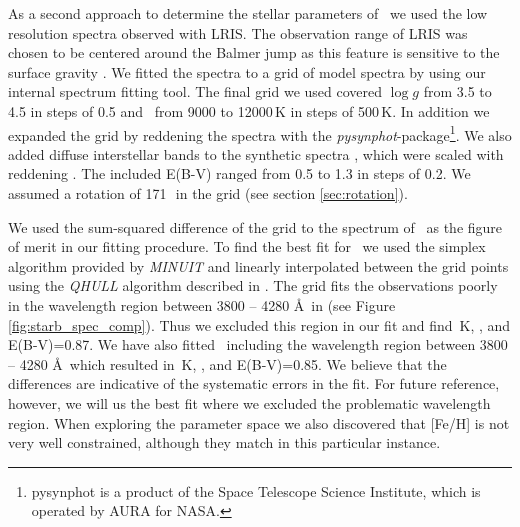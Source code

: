 As a second approach to determine the stellar parameters of \starb\ we used the low resolution spectra observed with LRIS.  The observation range of LRIS was chosen to be centered around the Balmer jump as this feature is sensitive to the surface gravity \citep{2007PASP..119..605B}. We fitted the spectra to a grid of model spectra \citep[]{2005A&A...442.1127M} by using our internal spectrum fitting tool. The final grid we used covered $\log{g}$ from 3.5 to 4.5 in steps of 0.5 and \teff\ from 9000 to 12000\,K in steps of 500\,K. In addition we expanded the grid by reddening the spectra with the \textit{pysynphot}-package\footnote{pysynphot is a product of the Space Telescope Science Institute, which is operated by AURA for NASA.}. We also added diffuse interstellar bands  \citep{1937PASP...49..224B, 1966ZA.....64..512H, 1967IAUS...31...85H, 1975ApJ...196..129H, 1995ARA&A..33...19H, 1994dib..nasa...31H, 1994A&AS..106...39J, 1958ApJ...128...57W} to the synthetic spectra , which were scaled with reddening . The included E(B-V) ranged from 0.5 to 1.3 in steps of 0.2. We assumed a rotation of 171\,\kms\ in the grid  (see section \ref{sec:rotation}).

We used the sum-squared difference of the grid to the spectrum of \starb\ as the figure of merit in our fitting procedure. To find the best fit for \starb\ we used the simplex algorithm provided by \textit{MINUIT} \citep{James:1975dr} and linearly interpolated between the grid points using the \textit{QHULL} algorithm described in \citet{Barber96thequickhull}. The grid fits the observations poorly in the wavelength region between 3800 -- 4280 \AA\ in (see Figure \ref{fig:starb_spec_comp}). Thus we excluded this region in our fit and find \,K, ,  and E(B-V)=0.87. We have also fitted \starb\ including the wavelength region between 3800 -- 4280 \AA\ which resulted in \,K, ,  and E(B-V)=0.85. We believe that the differences are indicative of the systematic errors in the fit. For future reference, however, we will us the best fit where we excluded the problematic wavelength region. When exploring the parameter space we also discovered that [Fe/H] is not very well constrained, although they match in this particular instance.



